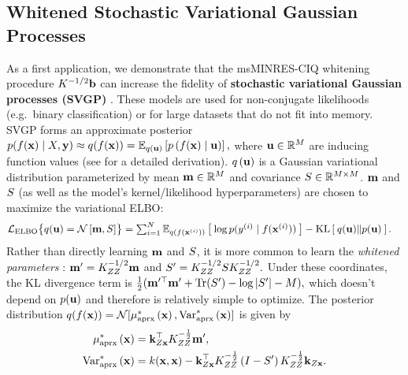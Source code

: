 \subsection{Whitened Stochastic Variational Gaussian Processes}
\label{sec:variational_results}

As a first application, we demonstrate that the msMINRES-CIQ whitening procedure $K^{-1/2} \mathbf{b}$ can increase the fidelity of {\bf stochastic variational Gaussian processes (SVGP)} \cite{hensman2013gaussian,hensman2015scalable,matthews2017scalable}.
These models are used for non-conjugate likelihoods (e.g.~binary classification) or for large datasets that do not fit into memory.
SVGP forms an approximate posterior
$
  p(f(\mathbf{x}) \mid X, \mathbf{y}) \approx q(f(\mathbf{x})) = \operatorname*{\mathbb{E}}_{q(\mathbf{u})} \left[  p\left( f(\mathbf{x}) \mid \mathbf{u} \right) \right],
$
where $\mathbf{u} \in \mathbb{R}^M$ are {inducing function values} (see \citep{hensman2015scalable,matthews2017scalable} for a detailed derivation).
$q \left( \mathbf{u} \right)$ is a Gaussian variational distribution parameterized by mean $\mathbf{m} \in \mathbb{R}^M$ and covariance $S \in \mathbb{R}^{M \times M}$.
$\mathbf{m}$ and $S$ (as well as the model's kernel/likelihood hyperparameters) are chosen to maximize the variational ELBO:
%
\begin{align*}
  \loglik_\text{ELBO}\bigl\{ q(\bu) = \normaldist{\bmm}{\bS} \bigr\} &= \textstyle\sum_{i=1}^N \Evover{q(f(\bx^{(i)}))}{  \: \log p( y^{(i)} \mid f(\bx^{(i)}) ) \: } - \kl{ q(\bu) }{ p(\bu) }.
\end{align*}
%
Rather than directly learning $\mathbf{m}$ and $S$, it is more common to learn the \emph{whitened parameters} \cite{kuss2005assessing,matthews2017scalable}:
$ \mathbf{m}' = K_{ZZ}^{- 1/ 2} \mathbf{m}$ and $S' = K_{ZZ}^{-1 / 2} S K_{ZZ}^{-1 / 2}. $
Under these coordinates, the KL divergence term is
$\frac{1}{2} ( \bmm^{\prime \top} \bmm' + \tr{ \bS' } - \log \vert \bS' \vert - M ),$
%
which doesn't depend on $p(\mathbf{u})$ and therefore is relatively simple to optimize.
The posterior distribution $q(f(\bx)) = \normaldist{\ameantest{\bx}}{\avartest{\bx}}$ is given by
%
\begin{equation}
  \begin{split}
    \mu^*_\text{aprx} \left( \mathbf{x} \right) &= \mathbf{k}_{Z\mathbf{x}}^\top K_{ZZ}^{-\frac 1 2} \mathbf{m}',
    \\
    \text{Var}^*_\text{aprx} \left( \mathbf{x} \right) &= k(\mathbf{x}, \mathbf{x}) -
      \mathbf{k}_{Z\mathbf{x}}^\top K_{ZZ}^{-\frac 1 2} \left( I - S' \right) K_{ZZ}^{-\frac 1 2} \mathbf{k}_{Z\mathbf{x}}.
  \end{split}
  \label{eqn:approx_pred_dist}
\end{equation}


